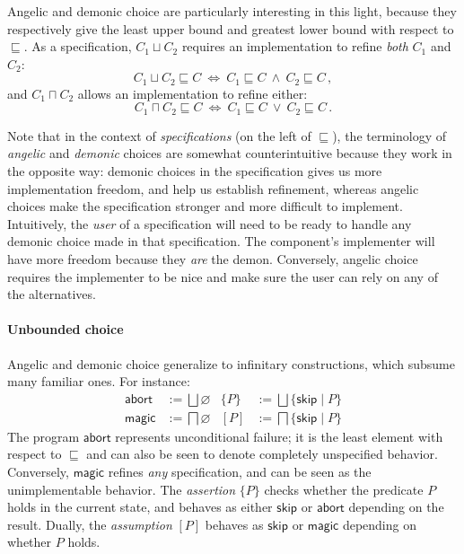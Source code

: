 \documentclass[format=sigplan,authordraft]{acmart}
\newcommand{\kw}[1]{\ensuremath{ \mathsf{#1} }}
\begin{document}
Angelic and demonic choice
are particularly interesting in this light,
because they respectively give the
least upper bound and greatest lower bound
with respect to $\sqsubseteq$.
As a specification, $C_1 \sqcup C_2$
requires an implementation to refine
\emph{both} $C_1$ and $C_2$:
\[
    C_1 \sqcup C_2 \sqsubseteq C \: \Leftrightarrow \:
    C_1 \sqsubseteq C \: \wedge \: C_2 \sqsubseteq C \,,
\]
and $C_1 \sqcap C_2$
allows an implementation to refine
either:
\[
    C_1 \sqcap C_2 \sqsubseteq C \: \Leftrightarrow \:
    C_1 \sqsubseteq C \: \vee \: C_2 \sqsubseteq C \,.
\]

Note that in the context of \emph{specifications}
(on the left of $\sqsubseteq$),
the terminology of \emph{angelic} and \emph{demonic}
choices are somewhat counterintuitive
because they work in the opposite way:
demonic choices in the specification gives us more
implementation freedom,
and help us establish refinement,
whereas angelic choices make the specification
stronger and more difficult to implement.
Intuitively,
the \emph{user} of a specification
will need to be ready to handle any demonic choice
made in that specification.
The component's implementer
will have more freedom because they \emph{are} the demon.
Conversely,
angelic choice requires the implementer to be nice
and make sure the user can rely on any of the alternatives.


\paragraph{Unbounded choice} %

Angelic and demonic choice
generalize to infinitary constructions,
which subsume many familiar ones.
For instance:
\begin{align*}
  \kw{abort} &:= \bigsqcup \varnothing &
  \{ P \} &:= \bigsqcup \{ \kw{skip} \mid P \} \\
  \kw{magic} &:= \bigsqcap \varnothing &
  [ P ] &:= \bigsqcap \{ \kw{skip} \mid P \}
\end{align*}
The program $\kw{abort}$ represents unconditional failure;
it is the least element with respect to $\sqsubseteq$
and can also be seen to denote completely unspecified behavior.
Conversely, $\kw{magic}$ refines \emph{any} specification,
and can be seen as the unimplementable behavior.
The \emph{assertion} $\{P\}$ checks whether
the predicate $P$ holds in the current state,
and behaves as either $\kw{skip}$ or $\kw{abort}$
depending on the result.
Dually, the \emph{assumption} $[P]$ behaves as
$\kw{skip}$ or $\kw{magic}$ depending on whether $P$ holds.
\end{document}
